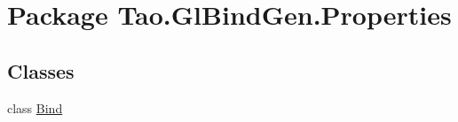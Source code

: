 \hypertarget{namespace_tao_1_1_gl_bind_gen_1_1_properties}{
\section{Package Tao.GlBindGen.Properties}
\label{namespace_tao_1_1_gl_bind_gen_1_1_properties}
}
\subsection*{Classes}
\begin{DoxyCompactItemize}
\item 
class \hyperlink{class_tao_1_1_gl_bind_gen_1_1_properties_1_1_bind}{Bind}
\end{DoxyCompactItemize}
